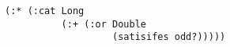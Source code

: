 \begin{lstlisting}[style=reclojureClojure]
(:* (:cat Long 
          (:+ (:or Double
                   (satisifes odd?)))))
\end{lstlisting}
